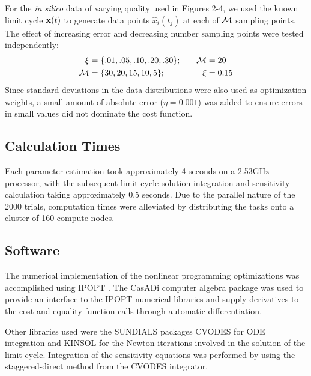 For the {\itshape in silico} data of varying quality used in Figures 2-4, we
used the known limit cycle ${\bf x}(t)$ to generate data points
$\hat{x}_i(t_j)$ at each of $\cal M$ sampling points. The effect of increasing
error and decreasing number sampling points were tested independently:
\begin{alignat*}{2}
     \xi &=  \{ .01, .05, .10, .20, .30\}; \quad & {\cal M} &= 20 \\
     {\cal M} &=  \{ 30, 20, 15, 10, 5\}; \; & \xi &= 0.15 
\end{alignat*}
Since standard deviations in the data distributions were also used as
optimization weights, a small amount of absolute error ($\eta = 0.001$) was
added to ensure errors in small values did not dominate the cost function.

\subsection{Calculation Times}
Each parameter estimation took approximately 4 seconds on a 2.53GHz processor,
with the subsequent limit cycle solution integration and sensitivity
calculation taking approximately 0.5 seconds. Due to the parallel nature of the
2000 trials, computation times were alleviated by distributing the tasks onto a
cluster of 160 compute nodes.

\subsection{Software}
The numerical implementation of the nonlinear programming optimizations was
accomplished using IPOPT \cite{Wachter2005}. The CasADi computer algebra
package \cite{Andersson2012} was used to provide an interface to the IPOPT
numerical libraries and supply derivatives to the cost and equality function
calls through automatic differentiation.

Other libraries used were the SUNDIALS \cite{Hindmarsh2005} packages CVODES for
ODE integration and KINSOL for the Newton iterations involved in the solution
of the limit cycle.  Integration of the sensitivity equations was performed by
using the staggered-direct method from the CVODES integrator.


